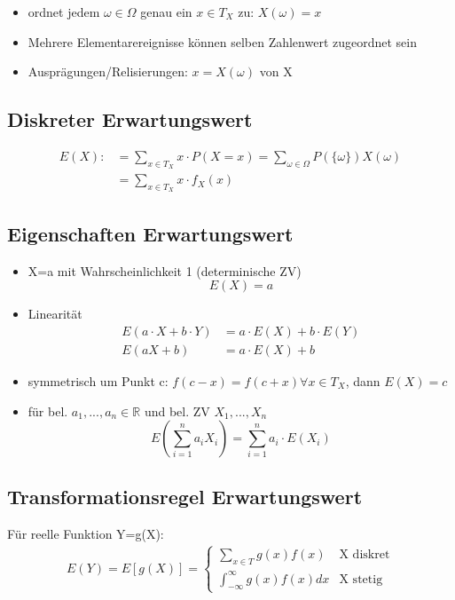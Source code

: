 \documentclass[10pt,a4paper,landscape]{article}
\begin{document}
\begin{multicols}{4}
\begin{itemize}
\item ordnet jedem $\omega \in \Omega$ genau ein $x \in T_X$ zu: $X(\omega)=x$
\item Mehrere Elementarereignisse können selben Zahlenwert zugeordnet sein
\item Ausprägungen/Relisierungen: $x=X(\omega)$ von X
\end{itemize}

\subsection{Diskreter Erwartungswert}
\begin{align*}
E(X) :&=\sum_{x\in T_X} x\cdot P(X=x) = \sum_{\omega \in \Omega} P(\{\omega\})X(\omega) \\
&= \sum_{x\in T_X} x\cdot f_X(x)
\end{align*}

\subsection{Eigenschaften Erwartungswert}
\begin{itemize}
\item X=a mit Wahrscheinlichkeit 1 (determinische ZV)
\[
E(X)=a
\]
\item Linearität
\begin{align*}
E(a\cdot X + b \cdot Y) &= a\cdot E(X) + b \cdot	E(Y) \\
E(aX+b) &= a\cdot E(X) + b
\end{align*}
\item symmetrisch um Punkt c: $f(c-x)=f(c+x) \forall x \in T_X$, dann $E(X)=c$
\item für bel. $a_1,...,a_n \in \mathbb{R}$ und bel. ZV $X_1,...,X_n$
\[
E\left(\sum_{i=1}^na_iX_i\right)=\sum_{i=1}^na_i \cdot E(X_i)
\]
\end{itemize}

\subsection{Transformationsregel Erwartungswert}
Für reelle Funktion Y=g(X):
\begin{align*}
E(Y)=E[g(X)]=\begin{cases}
\sum_{x\in T}g(x)f(x) &\text{X diskret} \\
\int_{-\infty}^{\infty}g(x)f(x)dx &\text{X stetig}
\end{cases}
\end{align*}


\end{multicols}
\end{document}
